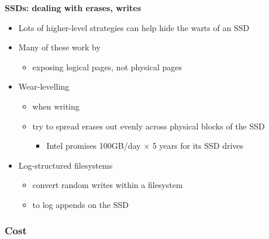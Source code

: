 \documentclass[11pt,a4paper]{article}
\begin{document}
\textbf{SSDs: dealing with erases, writes}
\begin{itemize}
    \item Lots of higher-level strategies can help hide the warts of an SSD
    \item Many of these work by
        \begin{itemize}
            \item exposing logical pages, not physical pages
        \end{itemize}
    \item Wear-levelling
        \begin{itemize}
            \item when writing
            \item try to spread erases out evenly across physical blocks of the SSD
                \begin{itemize}
                    \item Intel promises 100GB/day $\times$ 5 years for its SSD drives
                \end{itemize}
        \end{itemize}
    \item Log-structured filesystems
        \begin{itemize}
            \item convert random writes within a filesystem
            \item to log appends on the SSD
        \end{itemize}
\end{itemize}

\subsubsection{Cost}
\end{document}
